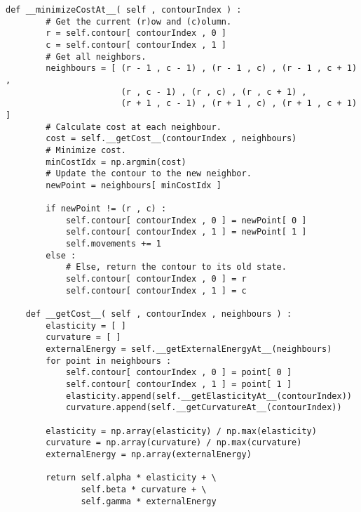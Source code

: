 \begin{lstlisting}[caption=Python implementation for Greedy Snake Contour,label=imp:snake]
    def __minimizeCostAt__( self , contourIndex ) :
        # Get the current (r)ow and (c)olumn.
        r = self.contour[ contourIndex , 0 ]
        c = self.contour[ contourIndex , 1 ]
        # Get all neighbors.
        neighbours = [ (r - 1 , c - 1) , (r - 1 , c) , (r - 1 , c + 1) ,
                       (r , c - 1) , (r , c) , (r , c + 1) ,
                       (r + 1 , c - 1) , (r + 1 , c) , (r + 1 , c + 1) ]
        # Calculate cost at each neighbour.
        cost = self.__getCost__(contourIndex , neighbours)
        # Minimize cost.
        minCostIdx = np.argmin(cost)
        # Update the contour to the new neighbor.
        newPoint = neighbours[ minCostIdx ]

        if newPoint != (r , c) :
            self.contour[ contourIndex , 0 ] = newPoint[ 0 ]
            self.contour[ contourIndex , 1 ] = newPoint[ 1 ]
            self.movements += 1
        else :
            # Else, return the contour to its old state.
            self.contour[ contourIndex , 0 ] = r
            self.contour[ contourIndex , 1 ] = c

    def __getCost__( self , contourIndex , neighbours ) :
        elasticity = [ ]
        curvature = [ ]
        externalEnergy = self.__getExternalEnergyAt__(neighbours)
        for point in neighbours :
            self.contour[ contourIndex , 0 ] = point[ 0 ]
            self.contour[ contourIndex , 1 ] = point[ 1 ]
            elasticity.append(self.__getElasticityAt__(contourIndex))
            curvature.append(self.__getCurvatureAt__(contourIndex))

        elasticity = np.array(elasticity) / np.max(elasticity)
        curvature = np.array(curvature) / np.max(curvature)
        externalEnergy = np.array(externalEnergy)

        return self.alpha * elasticity + \
               self.beta * curvature + \
               self.gamma * externalEnergy
\end{lstlisting}
